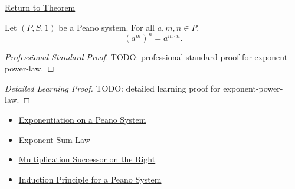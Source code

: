 \newpage
{}
\label{prf:exponent-power-law}

\begin{remark*}[Return]
\hyperref[thm:exponent-power-law]{Return to Theorem}
\end{remark*}

\begin{theorem*}
Let $(P,S,1)$ be a Peano system. For all $a,m,n \in P$,
\[
(a^m)^n = a^{m \cdot n}.
\]
\end{theorem*}

\begin{proof}[Professional Standard Proof]
\LRAProofBodyStart
TODO: professional standard proof for exponent-power-law.
\end{proof}

\begin{proof}[Detailed Learning Proof]
\LRAProofBodyStart
TODO: detailed learning proof for exponent-power-law.
\end{proof}

\begin{remark*}
\end{remark*}

\begin{dependencies}
\begin{itemize}
  \item \hyperref[def:exponentiation-on-peano-system]{Exponentiation on a Peano System}
  \item \hyperref[thm:exponent-sum-law]{Exponent Sum Law}
  \item \hyperref[thm:multiplication-successor-on-right]{Multiplication Successor on the Right}
  \item \hyperref[thm:induction-principle-for-peano-system]{Induction Principle for a Peano System}
\end{itemize}
\end{dependencies}

\clearpage

